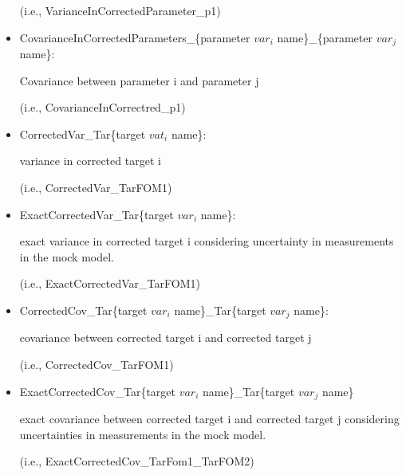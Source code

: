 \begin{itemize}
  (i.e., VarianceInCorrectedParameter\_p1)

  \item CovarianceInCorrectedParameters\_\{parameter $var_i$ name\}\_\{parameter $var_j$ name\}:

 Covariance between parameter i and parameter j

 (i.e., CovarianceInCorrectred\_p1)

  \item CorrectedVar\_Tar\{target $vat_i$ name\}:

   variance in corrected target i

   (i.e., CorrectedVar\_TarFOM1)

  \item ExactCorrectedVar\_Tar\{target $var_i$ name\}:

  exact variance in corrected target i considering uncertainty in measurements in the mock model.

  (i.e., ExactCorrectedVar\_TarFOM1)

  \item CorrectedCov\_Tar\{target $var_i$ name\}\_Tar\{target $var_j$ name\}:

  covariance between corrected target i and corrected target j

  (i.e., CorrectedCov\_TarFOM1)

  \item ExactCorrectedCov\_Tar\{target $var_i$ name\}\_Tar\{target $var_j$ name\}

   exact covariance between corrected target i and corrected target j considering uncertainties in measurements in the mock model.

   (i.e., ExactCorrectedCov\_TarFom1\_TarFOM2)


\end{itemize}


